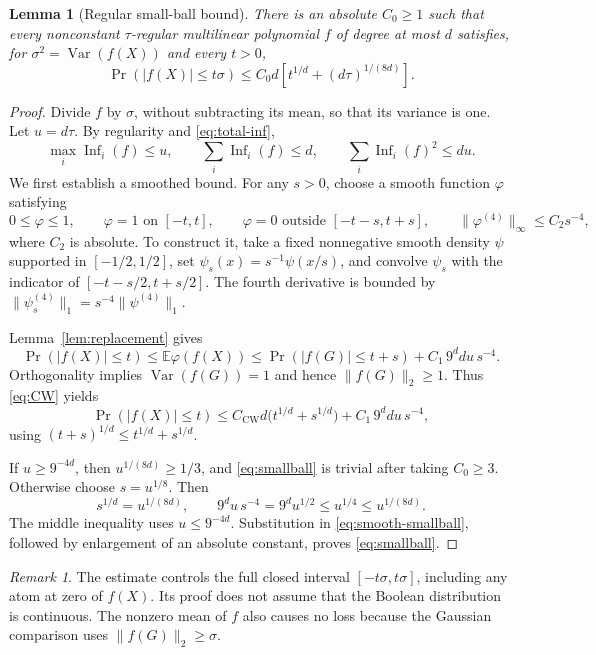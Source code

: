 \documentclass[11pt]{article}
\newcommand{\E}{\mathbb E}
\newcommand{\Var}{\operatorname{Var}}
\newcommand{\Inf}{\operatorname{Inf}}
\newcommand{\1}{\mathbf 1}
\newtheorem{lemma}[theorem]{Lemma}
\theoremstyle{definition}
\theoremstyle{remark}
\newtheorem{remark}[theorem]{Remark}
\numberwithin{equation}{section}
\begin{document}
\begin{lemma}[Regular small-ball bound]\label{lem:smallball}
There is an absolute $C_0\ge1$ such that every nonconstant $\tau$-regular multilinear polynomial $f$ of degree at most $d$ satisfies, for $\sigma^2=\Var(f(X))$ and every $t>0$,
\begin{equation}\label{eq:smallball}
 \Pr(|f(X)|\le t\sigma)
 \le C_0d\left[t^{1/d}+(d\tau)^{1/(8d)}\right].
\end{equation}
\end{lemma}
\begin{proof}
Divide $f$ by $\sigma$, without subtracting its mean, so that its variance is one. Let $u=d\tau$. By regularity and \eqref{eq:total-inf},
\[
 \max_i\Inf_i(f)\le u,\qquad
 \sum_i\Inf_i(f)\le d,\qquad
 \sum_i\Inf_i(f)^2\le du.
\]
We first establish a smoothed bound. For any $s>0$, choose a smooth function $\varphi$ satisfying
\[
 0\le\varphi\le1,\qquad
 \varphi=1\text{ on }[-t,t],\qquad
 \varphi=0\text{ outside }[-t-s,t+s],\qquad
 \|\varphi^{(4)}\|_\infty\le C_2 s^{-4},
\]
where $C_2$ is absolute. To construct it, take a fixed nonnegative smooth density $\psi$ supported in $[-1/2,1/2]$, set $\psi_s(x)=s^{-1}\psi(x/s)$, and convolve $\psi_s$ with the indicator of $[-t-s/2,t+s/2]$. The fourth derivative is bounded by $\|\psi_s^{(4)}\|_1=s^{-4}\|\psi^{(4)}\|_1$.

Lemma~\ref{lem:replacement} gives
\[
 \Pr(|f(X)|\le t)
 \le\E\varphi(f(X))
 \le\Pr(|f(G)|\le t+s)+C_1\,9^ddu\,s^{-4}.
\]
Orthogonality implies $\Var(f(G))=1$ and hence $\|f(G)\|_2\ge1$. Thus \eqref{eq:CW} yields
\begin{equation}\label{eq:smooth-smallball}
 \Pr(|f(X)|\le t)
 \le C_{\mathrm{CW}}d\bigl(t^{1/d}+s^{1/d}\bigr)
      +C_1\,9^ddu\,s^{-4},
\end{equation}
using $(t+s)^{1/d}\le t^{1/d}+s^{1/d}$.

If $u\ge9^{-4d}$, then $u^{1/(8d)}\ge1/3$, and \eqref{eq:smallball} is trivial after taking $C_0\ge3$. Otherwise choose $s=u^{1/8}$. Then
\[
 s^{1/d}=u^{1/(8d)},\qquad
 9^du\,s^{-4}=9^du^{1/2}\le u^{1/4}\le u^{1/(8d)}.
\]
The middle inequality uses $u\le9^{-4d}$. Substitution in \eqref{eq:smooth-smallball}, followed by enlargement of an absolute constant, proves \eqref{eq:smallball}.
\end{proof}

\begin{remark}
The estimate controls the full closed interval $[-t\sigma,t\sigma]$, including any atom at zero of $f(X)$. Its proof does not assume that the Boolean distribution is continuous. The nonzero mean of $f$ also causes no loss because the Gaussian comparison uses $\|f(G)\|_2\ge\sigma$.
\end{remark}
\end{document}
